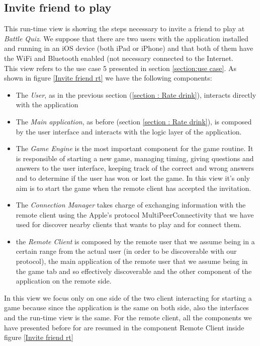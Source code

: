 \documentclass[paper=a4, fontsize=12pt]{scrartcl}
\numberwithin{equation}{section}		%
\numberwithin{figure}{section}			%
\numberwithin{table}{section}				%
\begin{document}
\subsection{Invite friend to play}
This run-time view is showing the steps necessary to invite a friend to play at \textit{Battle Quiz}. We suppose that there are two users with the application installed and running in an iOS device (both iPad or iPhone) and that both of them have the WiFi and Bluetooth enabled (not necessary connected to the Internet.\\
This view refers to the use case 5 presented in section \ref{section:use case}.
As shown in figure \ref{Invite friend rt} we have the following components:
\begin{itemize}
    \item The \textit{User}, as in the previous section (\ref{section : Rate drink}), interacts directly with the application
    \item The \textit{Main application}, as before (section \ref{section : Rate drink}), is composed by the user interface and interacts with the logic layer of the application.
    \item The \textit{Game Engine} is the most important component for the game routine. It is responsible of starting a new game, managing timing, giving questions and answers to the user interface, keeping track of the correct and wrong answers and to determine if the user has won or lost the game. In this view it's only aim is to start the game when the remote client has accepted the invitation.
    \item The \textit{Connection Manager} takes charge of exchanging information with the remote client using the Apple's protocol MultiPeerConnectivity that we have used for discover nearby clients that wants to play and for connect them.
    \item the \textit{Remote Client} is composed by the remote user that we assume being in a certain range from the actual user (in order to be discoverable with our protocol), the main application of the remote user that we assume being in the game tab and so effectively discoverable and the other component of the application on the remote side.
\end{itemize}
In this view we focus only on one side of the two client interacting for starting a game because since the application is the same on both side, also the interfaces and the run-time view is the same. For the remote client, all the components we have presented before for are resumed in the component Remote Client inside figure \ref{Invite friend rt}
\end{document}
